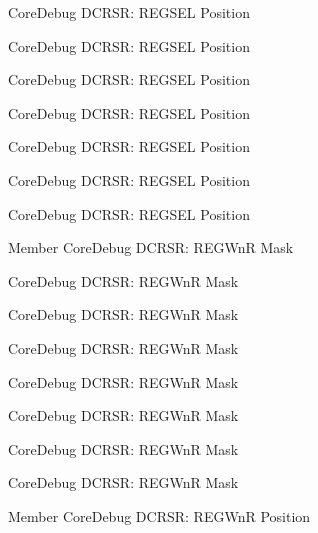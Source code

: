 \begin{DoxyRefList}
\label{deprecated__deprecated000405}%
%
Core\+Debug DCRSR\+: REGSEL Position 

\label{deprecated__deprecated000187}%
%
Core\+Debug DCRSR\+: REGSEL Position 

\label{deprecated__deprecated000131}%
%
Core\+Debug DCRSR\+: REGSEL Position 

\label{deprecated__deprecated000270}%
%
Core\+Debug DCRSR\+: REGSEL Position 

\label{deprecated__deprecated000043}%
%
Core\+Debug DCRSR\+: REGSEL Position 

\label{deprecated__deprecated000329}%
%
Core\+Debug DCRSR\+: REGSEL Position 

\label{deprecated__deprecated000596}%
%
Core\+Debug DCRSR\+: REGSEL Position  
\item[Member \doxylink{group__CMSIS__CoreDebug_ga1eef4992d8f84bc6c0dffed1c87f90a5}{Core\+Debug\+\_\+\+DCRSR\+\_\+\+REGWn\+R\+\_\+\+Msk} ]\label{deprecated__deprecated000595}%
%
Core\+Debug DCRSR\+: REGWnR Mask 

\label{deprecated__deprecated000186}%
%
Core\+Debug DCRSR\+: REGWnR Mask 

\label{deprecated__deprecated000404}%
%
Core\+Debug DCRSR\+: REGWnR Mask 

\label{deprecated__deprecated000042}%
%
Core\+Debug DCRSR\+: REGWnR Mask 

\label{deprecated__deprecated000130}%
%
Core\+Debug DCRSR\+: REGWnR Mask 

\label{deprecated__deprecated000493}%
%
Core\+Debug DCRSR\+: REGWnR Mask 

\label{deprecated__deprecated000328}%
%
Core\+Debug DCRSR\+: REGWnR Mask 

\label{deprecated__deprecated000269}%
%
Core\+Debug DCRSR\+: REGWnR Mask  
\item[Member \doxylink{group__CMSIS__CoreDebug_ga51e75942fc0614bc9bb2c0e96fcdda9a}{Core\+Debug\+\_\+\+DCRSR\+\_\+\+REGWn\+R\+\_\+\+Pos} ]\label{deprecated__deprecated000492}%
%
Core\+Debug DCRSR\+: REGWnR Position 


\end{DoxyRefList}
